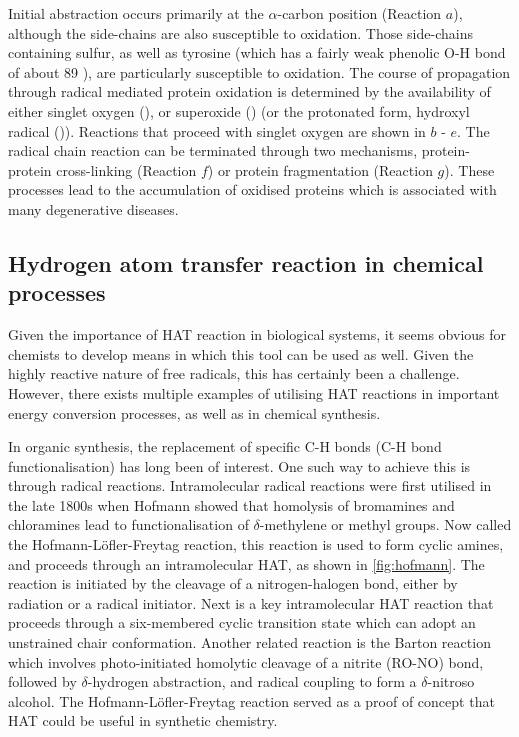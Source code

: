 Initial abstraction occurs primarily at the $\alpha$-carbon position (Reaction
$a$), although the side-chains are also susceptible to oxidation.  Those
side-chains containing sulfur,\cite{Stadtman2004} as well as tyrosine (which has
a fairly weak phenolic O-H bond of about 89 \kcalmol),\cite{Mulder2005} are
particularly susceptible to oxidation. The course of propagation through radical
mediated protein oxidation is determined by the availability of either singlet
oxygen (), or superoxide () (or the protonated form,
hydroxyl radical ()). Reactions that proceed with singlet oxygen are
shown in $b$ - $e$. The radical chain reaction can be terminated through two
mechanisms, protein-protein cross-linking (Reaction $f$) or protein
fragmentation (Reaction $g$). These processes lead to the accumulation of
oxidised proteins which is associated with many degenerative
diseases.\cite{Halliwell2006}


\subsection{Hydrogen atom transfer reaction in chemical processes}

Given the importance of HAT reaction in biological systems, it seems obvious for
chemists to develop means in which this tool can be used as well. Given the
highly reactive nature of free radicals, this has certainly been a challenge.
However, there exists multiple examples of utilising HAT reactions in important
energy conversion processes,\cite{Hammes-Schiffer2012} as well as in chemical
synthesis.\cite{Balcells2016,Miller2016}

In organic synthesis, the replacement of specific C-H bonds (C-H bond
functionalisation) has long been of interest. One such way to achieve this is
through radical reactions.\cite{Godula2006} Intramolecular radical reactions
were first utilised in the late 1800s when Hofmann showed that homolysis of
bromamines and chloramines lead to functionalisation of $\delta$-methylene or
methyl groups. Now called the
Hofmann-L{\"o}fler-Freytag reaction, this reaction is used to form cyclic
amines, and proceeds through an intramolecular HAT, as shown in
\ref{fig:hofmann}. The reaction is initiated by the cleavage of a
nitrogen-halogen bond, either by radiation or a radical initiator. Next is a key
intramolecular HAT reaction that proceeds through a six-membered cyclic
transition state which can adopt an unstrained chair conformation.  Another
related reaction is the Barton reaction\cite{Barton1960} which involves
photo-initiated homolytic cleavage of a nitrite (RO-NO) bond, followed by
$\delta$-hydrogen abstraction, and radical coupling to form a $\delta$-nitroso
alcohol. The Hofmann-L{\"o}fler-Freytag reaction served as a proof of concept
that HAT could be useful in synthetic chemistry.

